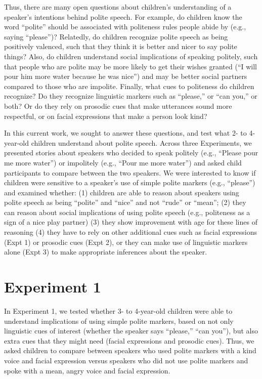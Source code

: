 \documentclass[10pt, letterpaper]{article}
\begin{document}
Thus, there are many open questions about children's understanding of a
speaker's intentions behind polite speech. For example, do children know
the word ``polite'' should be associated with politeness rules people
abide by (e.g., saying ``please'')? Relatedly, do children recognize
polite speech as being positively valenced, such that they think it is
better and nicer to say polite things? Also, do children understand
social implications of speaking politely, such that people who are
polite may be more likely to get their wishes granted (``I will pour him
more water because he was nice'') and may be better social partners
compared to those who are impolite. Finally, what cues to politeness do
children recognize? Do they recognize linguistic markers such as
``please,'' or ``can you,'' or both? Or do they rely on prosodic cues
that make utterances sound more respectful, or on facial expressions
that make a person look kind?

In this current work, we sought to answer these questions, and test what
2- to 4-year-old children understand about polite speech. Across three
Experiments, we presented stories about speakers who decided to speak
politely (e.g., ``Please pour me more water'') or impolitely (e.g.,
``Pour me more water'') and asked child participants to compare between
the two speakers. We were interested to know if children were sensitive
to a speaker's use of simple polite markers (e.g., ``please'') and
examined whether: (1) children are able to reason about speakers using
polite speech as being ``polite'' and ``nice'' and not ``rude'' or
``mean''; (2) they can reason about social implications of using polite
speech (e.g., politeness as a sign of a nice play partner) (3) they show
improvement with age for these lines of reasoning (4) they have to rely
on other additional cues such as facial expressions (Expt 1) or prosodic
cues (Expt 2), or they can make use of linguistic markers alone (Expt 3)
to make appropriate inferences about the speaker.

\section{Experiment 1}\label{experiment-1}

In Experiment 1, we tested whether 3- to 4-year-old children were able
to understand implications of using simple polite markers, based on not
only linguistic cues of interest (whether the speaker says ``please,''
``can you''), but also extra cues that they might need (facial
expressions and prosodic cues). Thus, we asked children to compare
between speakers who used polite markers with a kind voice and facial
expression versus speakers who did not use polite markers and spoke with
a mean, angry voice and facial expression.
\end{document}
